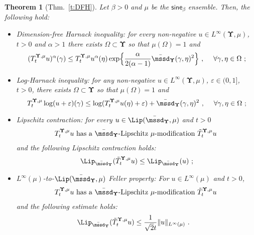\documentclass[11pt,letterpaper]{amsart}
\newcommand{\dom}[1]{\mathcal D(#1)}
\newcommand{\comma}{\,\,\mathrm{,}\;\,}
\newcommand{\fstop}{\,\,\mathrm{.}}
\newcommand{\purple}[1]{{\color{purple}#1}}
\newcommand{\QP}{{\mu}}
\newcommand{\e}{\varepsilon}
\newcommand{\dUpsilon}{{\mathbf \Upsilon}}
\newcommand{\U}{\dUpsilon}
\newcommand{\sine}{\mathsf{sine}}
\newcommand{\E}{\mathcal E}
\renewcommand{\1}{\mathbf 1}
\numberwithin{equation}{section}
\theoremstyle{plain}
\newtheorem{thm}{Theorem}[section]
\theoremstyle{definition}
\theoremstyle{remark}
\begin{document}
\begin{thm}[Thm.~\ref{t:DFH}] \label{t:3}
Let $\beta>0$ and $\QP$ be the $\sine_\beta$ ensemble.  Then, the following hold:
\begin{itemize}
\item Dimension-free Harnack inequality: for every non-negative $u \in L^\infty(\U, \QP)$, $t>0$ and $\alpha>1$ there exists $\Omega \subset \U$ so that $\QP(\Omega)=1$ and 
$$(T^{\U, \QP}_tu)^\alpha(\gamma)\le T^{\U, \QP}_tu^\alpha(\eta) \exp\Bigl\{ \frac{\alpha }{2(\alpha-1)}\bar{\mssd}_\U(\gamma, \eta)^2\Bigr\} \comma \quad \text{$\forall \gamma, \eta \in \Omega$} \ ;$$

\item Log-Harnack inequality: for any non-negative $u \in L^\infty(\U, \QP)$, $\e \in (0, 1]$, $t>0$, there exists $\Omega \subset \U$ so that $\QP(\Omega)=1$ and 
$$T^{\U, \QP}_t\log (u+\e)(\gamma) \le \log (T^{\U, \QP}_tu(\eta) +\e)+ \bar{\mssd}_\U(\gamma, \eta)^2\comma \quad \text{$\forall \gamma, \eta \in \Omega$} \ ;$$
\item  Lipschitz contraction: for every $u \in \Lip(\bar{\mssd}_\U, \QP)$ and $t>0$
\begin{align*}
\text{$T_t^{\U, \QP}u$ has a $\bar{\mssd}_\U$-Lipschitz $\QP$-modification~$\tilde{T}_t^{\U, \QP}u$ }
\end{align*}
and the following Lipschitz contraction holds:
$$\Lip_{\bar{\mssd}_\U}(\tilde{T}_t^{\U, \QP}u) \le \Lip_{\bar{\mssd}_\U}(u) \ ;$$
\item  {$L^\infty(\QP)$-to-$\Lip(\bar{\mssd}_\U, \QP)$ Feller property}: 
For $u \in L^\infty(\QP)$ and $t>0$, 
\begin{align*}
\text{$T_t^{\U, \QP}u$ has a $\bar{\mssd}_\U$-Lipschitz $\QP$-modification~$\tilde{T}_t^{\U, \QP}u$ }
\end{align*}
and the following estimate holds:
\begin{align*}%
&\Lip_{\bar{\mssd}_\U}(\tilde{T}_t^{\U, \QP} u) \le \frac{1}{\sqrt{2} t} \|u\|_{L^\infty(\QP)}  \fstop
\end{align*}


\end{itemize}
\end{thm}
\end{document}
